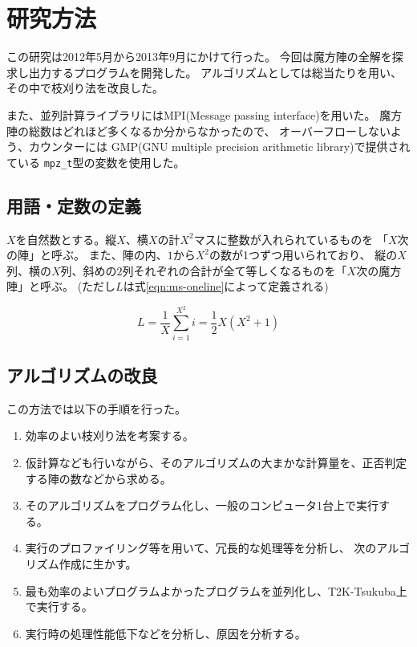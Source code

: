 \section{研究方法}
この研究は2012年5月から2013年9月にかけて行った。
今回は魔方陣の全解を探求し出力するプログラムを開発した。
アルゴリズムとしては総当たりを用い、その中で枝刈り法を改良した。

また、並列計算ライブラリにはMPI(Message passing interface)を用いた。
魔方陣の総数はどれほど多くなるか分からなかったので、
オーバーフローしないよう、カウンターには
GMP(GNU multiple precision arithmetic library)で提供されている
{\tt mpz\_t}型の変数を使用した。

\subsection{用語・定数の定義}
$X$を自然数とする。縦$X$、横$X$の計$X^2$マスに整数が入れられているものを
「$X$次の陣」と呼ぶ。
また、陣の内、$1$から$X^2$の数が1つずつ用いられており、
縦の$X$列、横の$X$列、斜めの$2$列それぞれの合計が全て等しくなるものを「$X$次の魔方陣」と呼ぶ。
(ただし$L$は式\ref{eqn:ms-oneline}によって定義される)

\begin{equation} \label{eqn:ms-oneline}
L=\frac{1}{X} \sum_{i=1}^{X^2}i = \frac{1}{2} X(X^2+1)
\end{equation}


\subsection{アルゴリズムの改良}
この方法では以下の手順を行った。
\begin{enumerate}
	\item 効率のよい枝刈り法を考案する。
	\item 仮計算なども行いながら、そのアルゴリズムの大まかな計算量を、正否判定する陣の数などから求める。
	\item そのアルゴリズムをプログラム化し、一般のコンピュータ1台上で実行する。
	\item 実行のプロファイリング等を用いて、冗長的な処理等を分析し、
	 	次のアルゴリズム作成に生かす。
	\item 最も効率のよいプログラムよかったプログラムを並列化し、T2K-Tsukuba上で実行する。
	\item 実行時の処理性能低下などを分析し、原因を分析する。
\end{enumerate}



